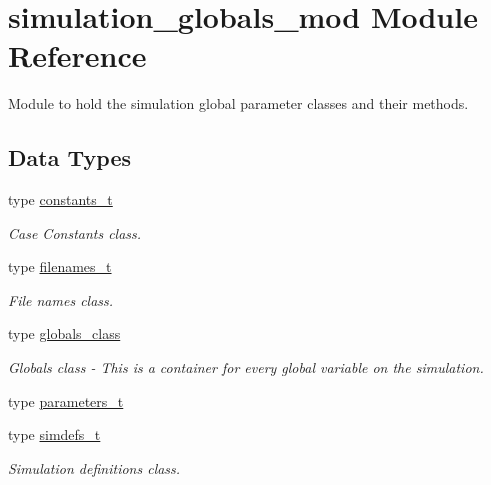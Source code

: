 \hypertarget{namespacesimulation__globals__mod}{}\section{simulation\+\_\+globals\+\_\+mod Module Reference}
\label{namespacesimulation__globals__mod}


Module to hold the simulation global parameter classes and their methods.  


\subsection*{Data Types}
\begin{DoxyCompactItemize}
\item 
type \hyperlink{structsimulation__globals__mod_1_1constants__t}{constants\+\_\+t}
\begin{DoxyCompactList}\small\item\em Case Constants class. \end{DoxyCompactList}\item 
type \hyperlink{structsimulation__globals__mod_1_1filenames__t}{filenames\+\_\+t}
\begin{DoxyCompactList}\small\item\em File names class. \end{DoxyCompactList}\item 
type \hyperlink{structsimulation__globals__mod_1_1globals__class}{globals\+\_\+class}
\begin{DoxyCompactList}\small\item\em Globals class -\/ This is a container for every global variable on the simulation. \end{DoxyCompactList}\item 
type \hyperlink{structsimulation__globals__mod_1_1parameters__t}{parameters\+\_\+t}
\item 
type \hyperlink{structsimulation__globals__mod_1_1simdefs__t}{simdefs\+\_\+t}
\begin{DoxyCompactList}\small\item\em Simulation definitions class. \end{DoxyCompactList}\end{DoxyCompactItemize}
